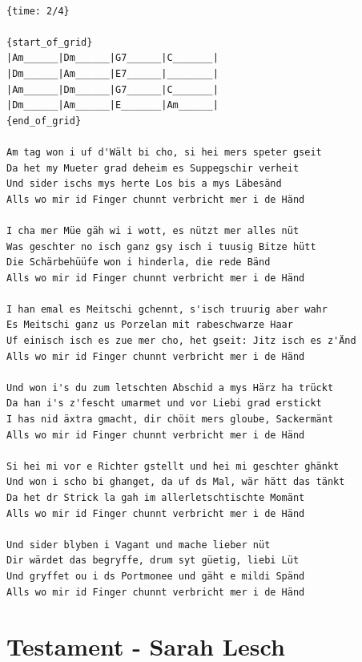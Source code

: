 \documentclass[
]{book}
\let\stdsection\section
\renewcommand\section{\clearpage\stdsection}
\begin{document}
\begin{verbatim}

{time: 2/4}

{start_of_grid}
|Am______|Dm______|G7______|C_______|
|Dm______|Am______|E7______|________|
|Am______|Dm______|G7______|C_______|
|Dm______|Am______|E_______|Am______| 
{end_of_grid}

Am tag won i uf d'Wält bi cho, si hei mers speter gseit
Da het my Mueter grad deheim es Suppegschir verheit
Und sider ischs mys herte Los bis a mys Läbesänd
Alls wo mir id Finger chunnt verbricht mer i de Händ

I cha mer Müe gäh wi i wott, es nützt mer alles nüt
Was geschter no isch ganz gsy isch i tuusig Bitze hütt
Die Schärbehüüfe won i hinderla, die rede Bänd
Alls wo mir id Finger chunnt verbricht mer i de Händ

I han emal es Meitschi gchennt, s'isch truurig aber wahr
Es Meitschi ganz us Porzelan mit rabeschwarze Haar
Uf einisch isch es zue mer cho, het gseit: Jitz isch es z'Änd
Alls wo mir id Finger chunnt verbricht mer i de Händ

Und won i's du zum letschten Abschid a mys Härz ha trückt
Da han i's z'fescht umarmet und vor Liebi grad erstickt
I has nid äxtra gmacht, dir chöit mers gloube, Sackermänt
Alls wo mir id Finger chunnt verbricht mer i de Händ

Si hei mi vor e Richter gstellt und hei mi geschter ghänkt
Und won i scho bi ghanget, da uf ds Mal, wär hätt das tänkt
Da het dr Strick la gah im allerletschtischte Momänt
Alls wo mir id Finger chunnt verbricht mer i de Händ

Und sider blyben i Vagant und mache lieber nüt
Dir wärdet das begryffe, drum syt güetig, liebi Lüt
Und gryffet ou i ds Portmonee und gäht e mildi Spänd
Alls wo mir id Finger chunnt verbricht mer i de Händ
\end{verbatim}

\hypertarget{testament---sarah-lesch}{%
\section{Testament - Sarah Lesch}\label{testament---sarah-lesch}}
\end{document}
